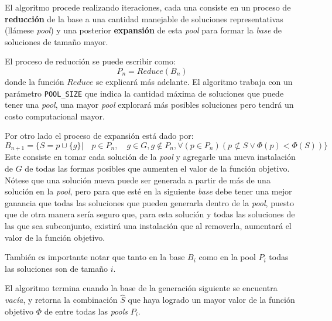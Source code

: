 El algoritmo procede realizando iteraciones, cada una consiste en un proceso de \textbf{reducción} de la base a una cantidad manejable de soluciones representativas (llámese \emph{pool}) y una posterior \textbf{expansión} de esta \emph{pool} para formar la \emph{base} de soluciones de tamaño mayor.

El proceso de reducción se puede escribir como:
\begin{equation}
P_n = Reduce(B_n)
\end{equation}
donde la función $Reduce$ se explicará más adelante. El algoritmo trabaja con un parámetro \texttt{POOL\_SIZE} que indica la cantidad máxima de soluciones que puede tener una \emph{pool}, una mayor \emph{pool} explorará más posibles soluciones pero tendrá un costo computacional mayor.

Por otro lado el proceso de expansión está dado por:
\begin{equation}
B_{n+1} = \{S = p \cup \{g\} |
    \quad p \in P_n, \quad g \in G, g \notin P_n, \forall (p \in P_n)( p \not\subset S \vee \Phi(p) < \Phi(S)) \}
\end{equation}
Este consiste en tomar cada solución de la \emph{pool} y agregarle una nueva instalación de $G$ de todas las formas posibles que aumenten el valor de la función objetivo. Nótese que una solución nueva puede ser generada a partir de más de una solución en la \emph{pool}, pero para que esté en la siguiente \emph{base} debe tener una mejor ganancia que todas las soluciones que pueden generarla dentro de la \emph{pool}, puesto que de otra manera sería seguro que, para esta solución y todas las soluciones de las que sea subconjunto, existirá una instalación que al removerla, aumentará el valor de la función objetivo.


También es importante notar que tanto en la base $B_i$ como en la pool $P_i$ todas las soluciones son de tamaño $i$.




El algoritmo termina cuando la base de la generación siguiente se encuentra \emph{vacía}, y retorna la combinación $\hat{S}$ que haya logrado un mayor valor de la función objetivo $\Phi$ de entre todas las \emph{pools} $P_i$.
